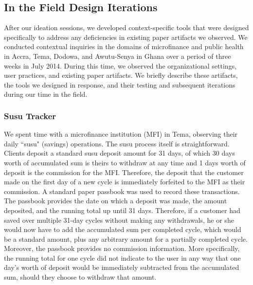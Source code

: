 \documentclass{sig-alternate}
\begin{document}

\subsection{In the Field Design Iterations}
\label{sec:field}

After our ideation sessions, we developed context-specific tools that were designed specifically to address any deficiencies in existing paper artifacts we observed. We conducted contextual inquiries in the domains of microfinance and public health in Accra, Tema, Dodowa, and Awutu-Senya in Ghana over a period of three weeks in July 2014. During this time, we observed the organizational settings, user practices, and existing paper artifacts. We briefly describe these artifacts, the tools we designed in response, and their testing and subsequent iterations during our time in the field.

\subsubsection{Susu Tracker}
We spent time with a microfinance institution (MFI) in Tema, observing their daily ``susu" (savings) operations. The susu process itself is straightforward. Clients deposit a standard susu deposit amount for 31 days, of which 30 days worth of accumulated sum is theirs to withdraw at any time and 1 days worth of deposit is the commission for the MFI. Therefore, the deposit that the customer made on the first day of a new cycle is immediately forfeited to the MFI as their commission. A standard paper passbook was used to record these transactions. The passbook provides the date on which a deposit was made, the amount deposited, and the running total up until 31 days. Therefore, if a customer had saved over multiple 31-day cycles without making any withdrawals, he or she would now have to add the accumulated sum per completed cycle, which would be a standard amount, plus any arbitrary amount for a partially completed cycle. Moreover, the passbook provides no commission information. More specifically, the running total for one cycle did not indicate to the user in any way that one day's worth of deposit would be immediately subtracted from the accumulated sum, should they choose to withdraw that amount.
\end{document}

